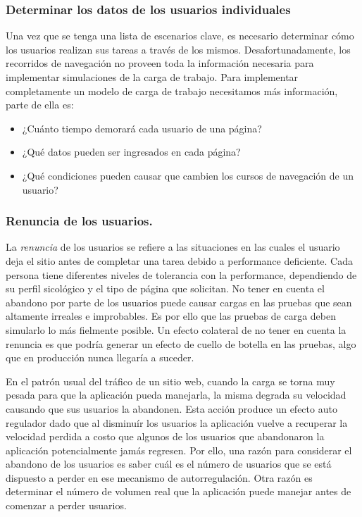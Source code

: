 \subsubsection{Determinar los datos de los usuarios individuales}
Una vez que se tenga una lista de escenarios clave, es necesario determinar cómo los usuarios realizan sus tareas a través de los mismos. Desafortunadamente, los recorridos
de navegación no proveen toda la información necesaria para implementar simulaciones de la carga de trabajo. Para implementar completamente un modelo de carga de trabajo
necesitamos más información, parte de ella es:
\begin{itemize}
	\item
	¿Cuánto tiempo demorará cada usuario de una página?
	\item
	¿Qué datos pueden ser ingresados en cada página?
	\item
	¿Qué condiciones pueden causar que cambien los cursos de navegación de un usuario?
\end{itemize}

\subsubsection{Renuncia de los usuarios.}
La \emph{renuncia} de los usuarios se refiere a las situaciones en las cuales el usuario deja el sitio antes de completar una tarea debido a performance deficiente. Cada persona
tiene diferentes niveles de tolerancia con la performance, dependiendo de su perfil sicológico y el tipo de página que solicitan. No tener en cuenta el abandono por parte de los
usuarios puede causar cargas en las pruebas que sean altamente irreales e improbables. Es por ello que las pruebas de carga deben simularlo lo más fielmente posible. Un efecto
colateral de no tener en cuenta la renuncia es que podría generar un efecto de cuello de botella en las pruebas, algo que en producción nunca llegaría a suceder.

En el patrón usual del tráfico de un sitio web, cuando la carga se torna muy pesada para que la aplicación pueda manejarla, la misma degrada su velocidad causando que sus usuarios
la abandonen. Esta acción produce un efecto auto regulador dado que al disminuír los usuarios la aplicación vuelve a recuperar la velocidad perdida a costo que algunos de los
usuarios que abandonaron la aplicación potencialmente jamás regresen. Por ello, una razón para considerar el abandono de los usuarios es saber cuál es el número de usuarios que
se está dispuesto a perder en ese mecanismo de autorregulación. Otra razón es determinar el número de volumen real que la aplicación puede manejar antes de comenzar a perder
usuarios.

